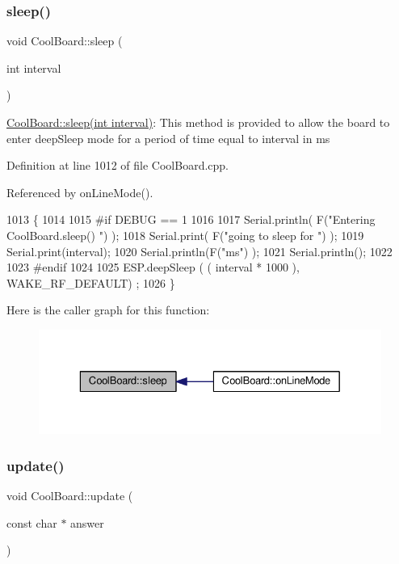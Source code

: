 \subsubsection{\texorpdfstring{sleep()}{sleep()}}
{\footnotesize\ttfamily void Cool\+Board\+::sleep (\begin{DoxyParamCaption}\item[{int}]{interval }\end{DoxyParamCaption})}

\hyperlink{classCoolBoard_a5d0c8ff93b615efd676be432de9f164a}{Cool\+Board\+::sleep(int interval)}\+: This method is provided to allow the board to enter deep\+Sleep mode for a period of time equal to interval in ms 

Definition at line 1012 of file Cool\+Board.\+cpp.



Referenced by on\+Line\+Mode().


\begin{DoxyCode}
1013 \{
1014 
1015 \textcolor{preprocessor}{#if DEBUG == 1}
1016 
1017     Serial.println( F(\textcolor{stringliteral}{"Entering CoolBoard.sleep() "}) );
1018     Serial.print( F(\textcolor{stringliteral}{"going to sleep for "}) );
1019     Serial.print(interval);
1020     Serial.println(F(\textcolor{stringliteral}{"ms"}) );
1021     Serial.println();
1022 
1023 \textcolor{preprocessor}{#endif}
1024 
1025     ESP.deepSleep ( ( interval * 1000 ), WAKE\_RF\_DEFAULT) ;
1026 \}
\end{DoxyCode}
Here is the caller graph for this function\+:
\nopagebreak
\begin{figure}[H]
\begin{center}
\leavevmode
\includegraphics[width=329pt]{classCoolBoard_a5d0c8ff93b615efd676be432de9f164a_icgraph}
\end{center}
\end{figure}
\mbox{\label{classCoolBoard_a8612756d3f73198cdde857a66f0fe690}} 
\subsubsection{\texorpdfstring{update()}{update()}}
{\footnotesize\ttfamily void Cool\+Board\+::update (\begin{DoxyParamCaption}\item[{const char $\ast$}]{answer }\end{DoxyParamCaption})}

